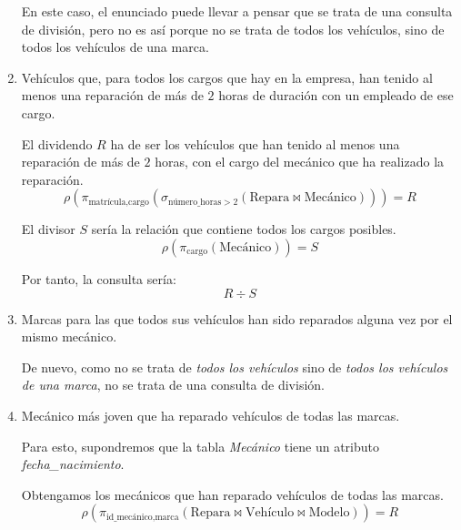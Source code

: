 \begin{ejercicio}
\begin{enumerate}
        \begin{observacion}
            En este caso, el enunciado puede llevar a pensar que se trata de una consulta de división, pero no es así porque no se trata de todos los vehículos, sino de todos los vehículos de una marca.
        \end{observacion}

        \item Vehículos que, para todos los cargos que hay en la empresa, han tenido al menos una reparación de más de $2$ horas de duración con un empleado de ese cargo.
        
        El dividendo $R$ ha de ser los vehículos que han tenido al menos una reparación de más de $2$ horas, con el cargo del mecánico que ha realizado la reparación.
        \begin{equation*}
            \rho\left(\pi_{\text{matrícula},\text{cargo}}(\sigma_{\text{número\_horas} > 2}(\text{Repara}\bowtie \text{Mecánico}))\right) = R
        \end{equation*}

        El divisor $S$ sería la relación que contiene todos los cargos posibles.
        \begin{equation*}
            \rho(\pi_{\text{cargo}}(\text{Mecánico})) = S
        \end{equation*}

        Por tanto, la consulta sería:
        \begin{equation*}
            R \div S
        \end{equation*}

        \item Marcas para las que todos sus vehículos han sido reparados alguna vez por el mismo mecánico.
        
        De nuevo, como no se trata de \emph{todos los vehículos} sino de \emph{todos los vehículos de una marca}, no se trata de una consulta de división.
        \item Mecánico más joven que ha reparado vehículos de todas las marcas.
        
        \begin{observacion}
            Para esto, supondremos que la tabla \emph{Mecánico} tiene un atributo \emph{fecha\_nacimiento}.
        \end{observacion}
        
        Obtengamos los mecánicos que han reparado vehículos de todas las marcas.
        \begin{equation*}
            \rho\left(\pi_{\text{id\_mecánico},\text{marca}}(\text{Repara}\bowtie \text{Vehículo}\bowtie \text{Modelo})\right) = R
        \end{equation*}


\end{enumerate}
\end{ejercicio}

